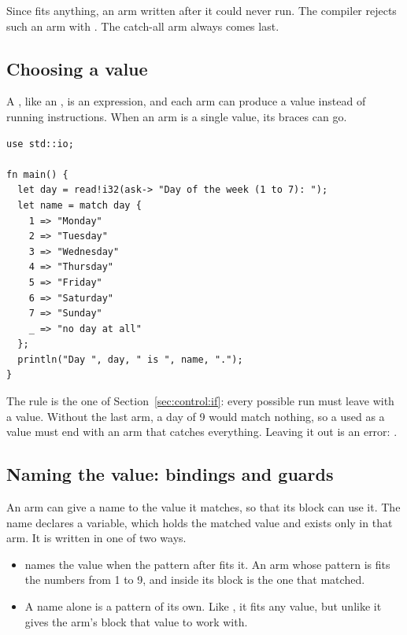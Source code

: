 Since \token{\_} fits anything, an arm written after it could never run. The
compiler rejects such an arm with . The
catch-all arm always comes last.

\subsection{Choosing a value}

A , like an , is an expression, and each arm can produce
a value instead of running instructions. When an arm is a single value, its
braces can go.

\begin{lstlisting}[style=coloredverbatim, caption=A \token{match} used as a value, label=lst:control:match_value]
use std::io;

fn main() {
  let day = read!i32(ask-> "Day of the week (1 to 7): ");
  let name = match day {
    1 => "Monday"
    2 => "Tuesday"
    3 => "Wednesday"
    4 => "Thursday"
    5 => "Friday"
    6 => "Saturday"
    7 => "Sunday"
    _ => "no day at all"
  };
  println("Day ", day, " is ", name, ".");
}
\end{lstlisting}

The rule is the one of Section~\ref{sec:control:if}: every possible run must
leave  with a value. Without the last arm, a day of 9 would match
nothing, so a  used as a value must end with an arm that catches
everything. Leaving it out is an error: .

\subsection{Naming the value: bindings and guards}

An arm can give a name to the value it matches, so that its block can use it.
The name declares a variable, which holds the matched value and exists only in
that arm. It is written in one of two ways.

\begin{itemize}
\item {} names the value when the pattern after \token{=}
  fits it. An arm whose pattern is  fits the numbers from 1
  to 9, and inside its block  is the one that matched.
\item A name alone is a pattern of its own. Like \token{\_}, it fits any value,
  but unlike \token{\_} it gives the arm's block that value to work with.
\end{itemize}

